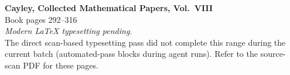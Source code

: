 \documentclass[11pt,a4paper]{article}
\begin{document}
\vspace*{2in}
\begin{center}
{\large\bfseries Cayley, Collected Mathematical Papers, Vol.~VIII}\\[1em]
{\large Book pages 292--316}\\[2em]
\textit{Modern LaTeX typesetting pending.}\\[1em]
The direct scan-based typesetting pass did not complete this range
during the current batch (automated-pass blocks during agent runs).
Refer to the source-scan PDF for these pages.
\end{center}
\end{document}
